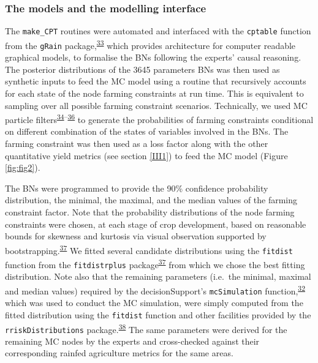 \documentclass[12pt,oneside]{article}
\begin{document}
\hypertarget{III32}{%
\subsubsection{The models and the modelling interface}\label{III32}}

The \texttt{make\_CPT} routines were automated and interfaced with the \texttt{cptable} function from the \texttt{gRain} package,\textsuperscript{\protect\hyperlink{ref-Hojsgaard_2012}{33}} which provides architecture for computer readable graphical models, to formalise the BNs following the experts' causal reasoning. The posterior distributions of the 3645 parameters BNs was then used as synthetic inputs to feed the MC model using a routine that recursively accounts for each state of the node farming constraints at run time. This is equivalent to sampling over all possible farming constraint scenarios. Technically, we used MC particle filters\textsuperscript{\protect\hyperlink{ref-Kitagawa_2016}{34}--\protect\hyperlink{ref-Scutari_2010}{36}} to generate the probabilities of farming constraints conditional on different combination of the states of variables involved in the BNs. The farming constraint was then used as a loss factor along with the other quantitative yield metrics (see section \ref{III1}) to feed the MC model (Figure \ref{fig:fig2}).

The BNs were programmed to provide the 90\% confidence probability distribution, the minimal, the maximal, and the median values of the farming constraint factor. Note that the probability distributions of the node farming constraints were chosen, at each stage of crop development, based on reasonable bounds for skewness and kurtosis via visual observation supported by bootstrapping.\textsuperscript{\protect\hyperlink{ref-Delignette-Muller_and_Dutang_2015}{37}} We fitted several candidate distributions using the \texttt{fitdist} function from the \texttt{fitdistrplus} package\textsuperscript{\protect\hyperlink{ref-Delignette-Muller_and_Dutang_2015}{37}} from which we chose the best fitting distribution. Note also that the remaining parameters (i.e.~the minimal, maximal and median values) required by the decisionSupport's \texttt{mcSimulation} function,\textsuperscript{\protect\hyperlink{ref-Luedeling_and_Goehring_2018}{32}} which was used to conduct the MC simulation, were simply computed from the fitted distribution using the \texttt{fitdist} function and other facilities provided by the \texttt{rriskDistributions} package.\textsuperscript{\protect\hyperlink{ref-Belgorodski_et_al_2017}{38}} The same parameters were derived for the remaining MC nodes by the experts and cross-checked against their corresponding rainfed agriculture metrics for the same areas.
\end{document}
